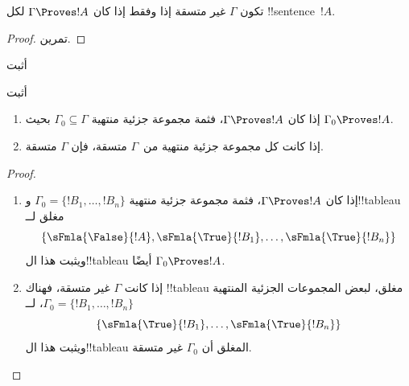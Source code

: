 \documentclass[../../../include/open-logic-section]{subfiles}
\begin{document}
\begin{prop}
تكون $\Gamma$ غير متسقة إذا وفقط إذا كان $\Gamma \Proves !A$ لكل
!!{sentence}~$!A$.
\end{prop}

\begin{proof}
تمرين.
\end{proof}

\begin{prob}
أثبت 
\end{prob}
\tagendprob

\begin{prob}
أثبت 
\end{prob}
\tagendprob

\begin{prop}[التراص]
  \begin{enumerate}
  \item إذا كان $\Gamma \Proves !A$، فثمة مجموعة جزئية منتهية $\Gamma_0
    \subseteq \Gamma$ بحيث $\Gamma_0 \Proves !A$.
  \item إذا كانت كل مجموعة جزئية منتهية من~$\Gamma$ متسقة، فإن $\Gamma$
    متسقة.
  \end{enumerate}
\end{prop}

\begin{proof}
  \begin{enumerate}
    \item إذا كان $\Gamma \Proves !A$، فثمة مجموعة جزئية منتهية
      $\Gamma_0 = \{!B_1, \dots, !B_n\}$ و!!{tableau} مغلق لــ
      \[
      \{\sFmla{\False}{!A}, \sFmla{\True}{!B_1}, \dots, \sFmla{\True}{!B_n}\}
      \]
      ويثبت هذا ال!!{tableau} أيضًا $\Gamma_0 \Proves !A$.
    \item إذا كانت $\Gamma$ غير متسقة، فهناك !!{tableau} مغلق، لبعض
      المجموعات الجزئية المنتهية
      $\Gamma_0 = \{!B_1, \dots, !B_n\}$، لــ
      \[
      \{\sFmla{\True}{!B_1}, \dots, \sFmla{\True}{!B_n}\}
      \]
      ويثبت هذا ال!!{tableau} المغلق أن $\Gamma_0$ غير متسقة.
  \end{enumerate}
\end{proof}
\end{document}
